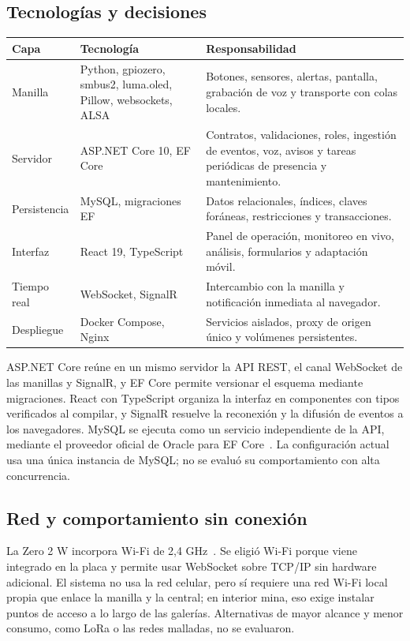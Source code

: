 \documentclass[10pt,a4paper]{article}
\begin{document}
\subsection{Tecnologías y decisiones}
\label{tab:tecnologias}
\begin{tabularx}{\linewidth}{@{}P{31mm}P{45mm}Y@{}}
\toprule\textbf{Capa} & \textbf{Tecnología} & \textbf{Responsabilidad}\\\midrule
Manilla & Python, gpiozero, smbus2, luma.oled, Pillow, websockets, ALSA & Botones, sensores, alertas, pantalla, grabación de voz y transporte con colas locales.\\
Servidor & ASP.NET Core 10, EF Core & Contratos, validaciones, roles, ingestión de eventos, voz, avisos y tareas periódicas de presencia y mantenimiento.\\
Persistencia & MySQL, migraciones EF & Datos relacionales, índices, claves foráneas, restricciones y transacciones.\\
Interfaz & React 19, TypeScript & Panel de operación, monitoreo en vivo, análisis, formularios y adaptación móvil.\\
Tiempo real & WebSocket, SignalR & Intercambio con la manilla y notificación inmediata al navegador.\\
Despliegue & Docker Compose, Nginx & Servicios aislados, proxy de origen único y volúmenes persistentes.\\\bottomrule
\end{tabularx}

ASP.NET Core reúne en un mismo servidor la API REST, el canal WebSocket de las manillas y SignalR, y EF Core permite versionar el esquema mediante migraciones. React con TypeScript organiza la interfaz en componentes con tipos verificados al compilar, y SignalR resuelve la reconexión y la difusión de eventos a los navegadores. MySQL se ejecuta como un servicio independiente de la API, mediante el proveedor oficial de Oracle para EF Core~\cite{mysql,provider}. La configuración actual usa una única instancia de MySQL; no se evaluó su comportamiento con alta concurrencia.

\subsection{Red y comportamiento sin conexión}
La Zero 2 W incorpora Wi-Fi de 2,4 GHz~\cite{rpi}. Se eligió Wi-Fi porque viene integrado en la placa y permite usar WebSocket sobre TCP/IP sin hardware adicional. El sistema no usa la red celular, pero sí requiere una red Wi-Fi local propia que enlace la manilla y la central; en interior mina, eso exige instalar puntos de acceso a lo largo de las galerías. Alternativas de mayor alcance y menor consumo, como LoRa o las redes malladas, no se evaluaron.
\end{document}
